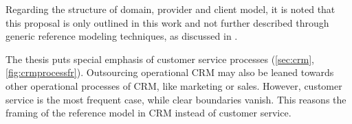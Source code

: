 Regarding the structure of domain, provider and client model, it is noted that this proposal is only outlined in this work and not further described through generic reference modeling techniques, as discussed in \cite{delfmann2006adaptive, brocke2003referenzmodellierung}. 

The thesis puts special emphasis of customer service processes (\cf \ref{sec:crm},  \Fig \ref{fig:crmprocessfr}). Outsourcing operational \acrshort{CRM} may also be leaned towards other operational processes of CRM, like marketing or sales. However, customer service is the most frequent case, while clear boundaries vanish. This reasons the framing of the reference model in \acrshort{CRM} instead of customer service. 


